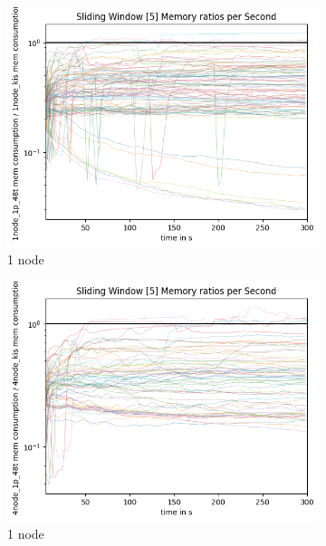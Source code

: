 \documentclass[12pt,a4paper,twoside]{scrartcl}
\numberwithin{equation}{section}
\begin{document}
\begin{figure}
  \center
  \begin{subfigure}[c]{.4\textwidth}
    \center
    \includegraphics[scale=.3]{plots/1node_compare/mem_ratio_per_second.png}
    \caption{1 node}
  \end{subfigure}
  \begin{subfigure}[c]{.4\textwidth}
    \center
    \includegraphics[scale=.3]{plots/4node_compare/mem_ratio_per_second.png}
    \caption{1 node}
  \end{subfigure}
  \begin{subfigure}[c]{.4\textwidth}
    \center

\end{subfigure}
\end{figure}
\end{document}
